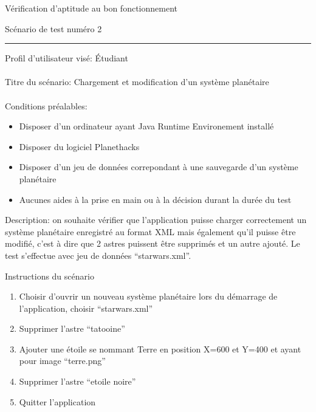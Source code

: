 \documentclass[a4paper,10pt]{article}
\begin{document}
\begin{center}
  \begin{huge}
    Vérification d'aptitude au bon fonctionnement \\
  \end{huge}
  \vspace{1cm}
  \begin{Large}
    Scénario de test numéro 2
  \end{Large}
\end{center}
\rule{\linewidth}{.5pt}
Profil d'utilisateur visé: Étudiant \\\\
Titre du scénario: Chargement et modification d'un système planétaire \\\\
Conditions préalables:
\begin{itemize}
 \item Disposer d'un ordinateur ayant Java Runtime Environement installé
 \item Disposer du logiciel Planethacks
 \item Disposer d'un jeu de données correpondant à une sauvegarde d'un système planétaire
 \item Aucunes aides à la prise en main ou à la décision durant la durée du test
\end{itemize}
Description: on souhaite vérifier que l'application puisse charger correctement un système planétaire enregistré au format 
XML mais également qu'il puisse être modifié, c'est à dire que 2 astres puissent être supprimés et un autre ajouté. 
Le test s'effectue avec jeu de données ``starwars.xml''.
\begin{center}
 \begin{Large}
    Instructions du scénario
  \end{Large}
\end{center}
\begin{enumerate}
 \item Choisir d'ouvrir un nouveau système planétaire lors du démarrage de l'application, choisir ``starwars.xml''
 \item Supprimer l'astre ``tatooine''
 \item Ajouter une étoile se nommant Terre en position X=600 et Y=400 et ayant pour image ``terre.png''
 \item Supprimer l'astre ``etoile noire''
 \item Quitter l'application
\end{enumerate}
\end{document}
